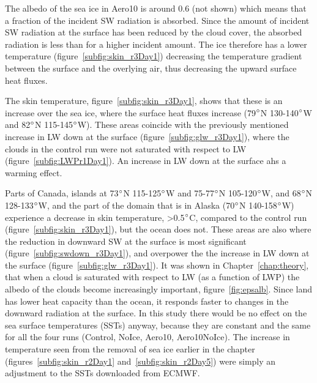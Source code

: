 The albedo of the sea ice in Aero10 is around 0.6 (not shown) which means that a fraction of the incident SW radiation is absorbed. Since the amount of incident SW radiation at the surface has been reduced by the cloud cover, the absorbed radiation is less than for a higher incident amount. The ice therefore has a lower temperature (figure~\ref{subfig:skin_r3Day1}) decreasing the temperature gradient between the surface and the overlying air, thus decreasing the upward surface heat fluxes.

The skin temperature, figure~\ref{subfig:skin_r3Day1}, shows that these is an increase over the sea ice, where the surface heat fluxes increase (79$\degree$N 130-140$\degree$W and 82$\degree$N 115-145$\degree$W). These areas coincide with the previously mentioned increase in LW down at the surface (figure~\ref{subfig:glw_r3Day1}), where the clouds in the control run were not saturated with respect to LW (figure~\ref{subfig:LWPr1Day1}). An increase in LW down at the surface ahs a warming effect.

Parts of Canada, islands at 73$\degree$N 115-125$\degree$W and 75-77$\degree$N 105-120$\degree$W, and 68$\degree$N 128-133$\degree$W, and the part of the domain that is in Alaska (70$\degree$N 140-158$\degree$W) experience a decrease in skin temperature, >0.5$\degree$C, compared to the control run (figure~\ref{subfig:skin_r3Day1}), but the ocean does not. These areas are also where the reduction in downward SW at the surface is most significant (figure~\ref{subfig:swdown_r3Day1}), and overpower the the increase in LW down at the surface (figure~\ref{subfig:glw_r3Day1}). It was shown in Chapter~\ref{chap:theory}, that when a cloud is saturated with respect to LW (as a function of LWP) the albedo of the clouds become increasingly important, figure~\ref{fig:epsalb}. Since land has lower heat capacity than the ocean, it responds faster to changes in the downward radiation at the surface. In this study there would be no effect on the sea surface temperatures (SSTs) anyway, because they are constant and the same for all the four runs (Control, NoIce, Aero10, Aero10NoIce). The increase in temperature seen from the removal of sea ice earlier in the chapter (figures~\ref{subfig:skin_r2Day1} and~\ref{subfig:skin_r2Day5}) were simply an adjustment to the SSTs downloaded from ECMWF.


